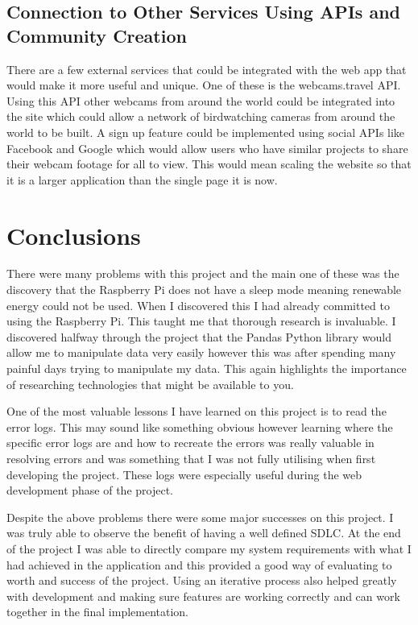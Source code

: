 \documentclass[10pt,a4paper]{article}
\begin{document}
\subsection{Connection to Other Services Using APIs and Community Creation}
There are a few external services that could be integrated with the web app that would make it more useful and unique. One of these is the webcams.travel API. Using this API other webcams from around the world could be integrated into the site which could allow a network of birdwatching cameras from around the world to be built. A sign up feature could be implemented using social APIs like Facebook and Google which would allow users who have similar projects to share their webcam footage for all to view. This would mean scaling the website so that it is a larger application than the single page it is now.


\pagebreak
\section{Conclusions}
There were many problems with this project and the main one of these was the discovery that the Raspberry Pi does not have a sleep mode meaning renewable energy could not be used. When I discovered this I had already committed to using the Raspberry Pi. This taught me that thorough research is invaluable. I discovered halfway through the project that the Pandas Python library would allow me to manipulate data very easily however this was after spending many painful days trying to manipulate my data. This again highlights the importance of researching technologies that might be available to you. 

One of the most valuable lessons I have learned on this project is to read the error logs. This may sound like something obvious however learning where the specific error logs are and how to recreate the errors was really valuable in resolving errors and was something that I was not fully utilising when first developing the project. These logs were especially useful during the web development phase of the project. 

Despite the above problems there were some major successes on this project. I was truly able to observe the benefit of having a well defined SDLC. At the end of the project I was able to directly compare my system requirements with what I had achieved in the application and this provided a good way of evaluating to worth and success of the project. Using an iterative process also helped greatly with development and making sure features are working correctly and can work together in the final implementation. 
\end{document}
